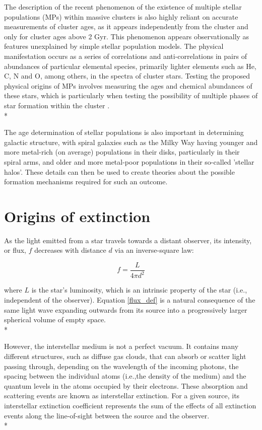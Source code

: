 \documentclass[12pt, a4paper]{report}
\begin{document}
The description of the recent phenomenon of the existence of multiple stellar populations (MPs) within massive clusters is also highly reliant on accurate measurements of cluster ages, as it appears independently from the cluster and only for cluster ages above 2 Gyr. This phenomenon appears observationally as features unexplained by simple stellar population models. The physical manifestation occurs as a series of correlations and anti-correlations in pairs of abundances of particular elemental species, primarily lighter elements such as He, C, N and O, among others, in the spectra of cluster stars. Testing the proposed physical origins of MPs involves measuring the ages and chemical abundances of these stars, which is particularly when testing the possibility of multiple phases of star formation within the cluster \citep{2018ARA&A..56...83B}. \\*

The age determination of stellar populations is also important in determining galactic structure, with spiral galaxies such as the Milky Way having younger and more metal-rich (on average) populations in their disks, particularly in their spiral arms, and older and more metal-poor populations in their so-called 'stellar halos'. These details can then be used to create theories about the possible formation mechanisms required for such an outcome.

\section{Origins of extinction}

As the light emitted from a star travels towards a distant observer, its intensity, or flux, $f$ decreases with distance $d$ via an inverse-square law:

\begin{equation}
\label{flux_def}
f = \frac{L}{4 \pi d^{2}}
\end{equation}

where $L$ is the star's luminosity, which is an intrinsic property of the star (i.e., independent of the observer). Equation \ref{flux_def} is a natural consequence of the same light wave expanding outwards from its source into a progressively larger spherical volume of empty space. \\*

However, the interstellar medium is not a perfect vacuum. It contains many different structures, such as diffuse gas clouds, that can absorb or scatter light passing through, depending on the wavelength of the incoming photons, the spacing between the individual atoms (i.e.,the density of the medium) and the quantum levels in the atoms occupied by their electrons. These absorption and scattering events are known as interstellar extinction. For a given source, its interstellar extinction coefficient represents the sum of the effects of all extinction events along the line-of-sight between the source and the observer. \\*
\end{document}

